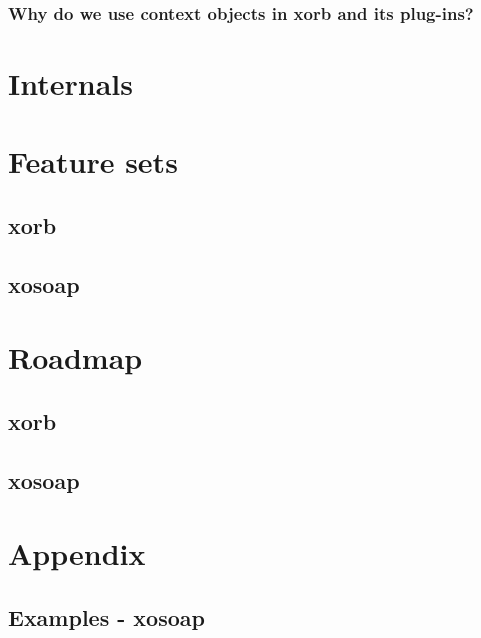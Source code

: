   \subsubsection{Why do we use context objects in xorb and its plug-ins?}\label{sec:advanced:xorb:gobjects:why}
  \section{Internals}\label{sec:internal}
  \section{Feature sets}
  \subsection{xorb}
  \subsection{xosoap}
  \section{Roadmap}
   \subsection{xorb}	
  \subsection{xosoap}
  \section{Appendix} 
  \subsection{Examples - xosoap} 
 
  
    
        
     
 \newpage
 
    
